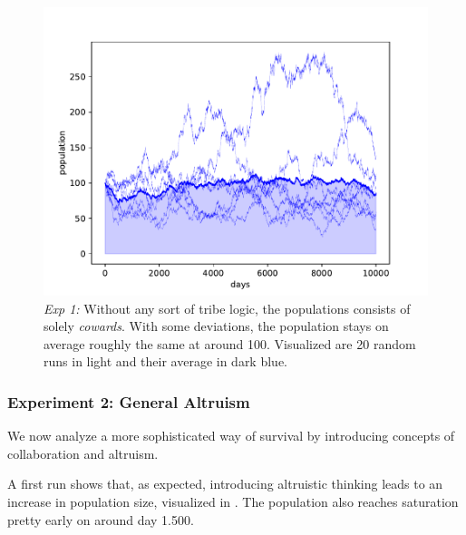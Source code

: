 \documentclass[sigconf]{acmart}
\newcommand{\VNumSimulations}{20\xspace}
\newcommand{\VNumPop}{100\xspace}
\newcommand{\cowards}{\textit{cowards}\xspace}
\begin{document}
    \begin{figure}
        \includegraphics[width=\columnwidth]{figures/exp1_stable_pop}
        \caption{\textit{Exp 1:} Without any sort of tribe logic, the populations consists of solely \cowards.
        With some deviations, the population stays on average roughly the same at around \VNumPop.
        Visualized are \VNumSimulations random runs in light and their average in dark blue. }
        \label{fig:stable_pop}
    \end{figure}


    \subsubsection*{Experiment 2: General Altruism}

    We now analyze a more sophisticated way of survival by introducing concepts of collaboration and altruism.

    A first run shows that, as expected, introducing altruistic thinking leads to an increase in population size, visualized in .
    The population also reaches saturation pretty early on around day 1.500.
\end{document}
